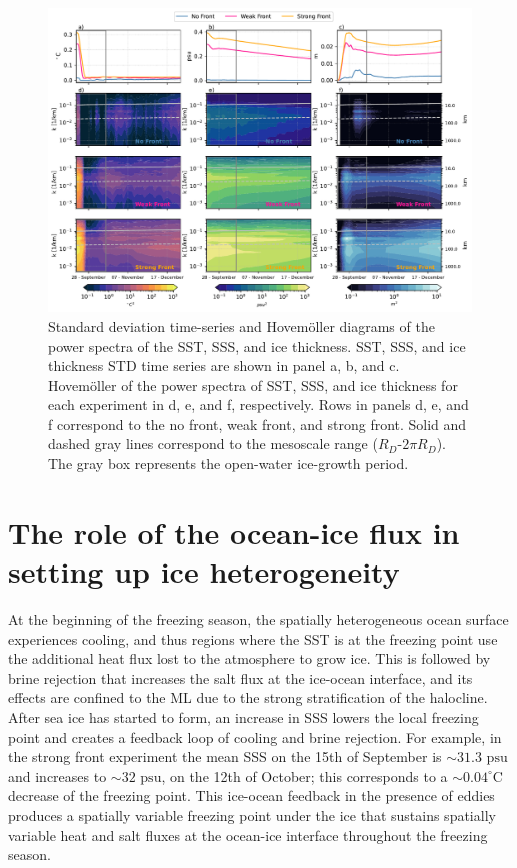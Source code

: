\documentclass[draft]{agujournal2019}
\begin{document}
\begin{figure}
    \includegraphics[width=1\textwidth]{Fig_3_STD_spectra_temp_salt_ice.pdf}
    \caption{Standard deviation time-series and Hovem\"oller diagrams of the power spectra of the SST, SSS, and ice thickness. SST, SSS, and ice thickness STD time series are shown in panel a, b, and c. Hovem\"oller of the power spectra of SST, SSS, and ice thickness for each experiment in d, e, and f, respectively. Rows in panels d, e, and f correspond to the no front, weak front, and strong front. Solid and dashed gray lines correspond to the mesoscale range ($R_D$-$2\pi R_D$). The gray box represents the open-water ice-growth period.}
    \label{fig:fig3}
\end{figure}

\section{The role of the ocean-ice flux in setting up ice heterogeneity}\label{subsec3}

At the beginning of the freezing season, the spatially heterogeneous ocean surface experiences cooling, and thus regions where the SST is at the freezing point use the additional heat flux lost to the atmosphere to grow ice. This is followed by brine rejection that increases the salt flux at the ice-ocean interface, and its effects are confined to the ML due to the strong stratification of the halocline. After sea ice has started to form, an increase in SSS lowers the local freezing point and creates a feedback loop of cooling and brine rejection. For example, in the strong front experiment the mean SSS on the 15th of September is $\sim31.3\text{ psu}$ and increases to $\sim32\text{ psu}$, on the 12th of October; this corresponds to a $\sim0.04^\circ\text{C}$ decrease of the freezing point. This ice-ocean feedback in the presence of eddies produces a spatially variable freezing point under the ice that sustains spatially variable heat and salt fluxes at the ocean-ice interface throughout the freezing season. 
\end{document}
